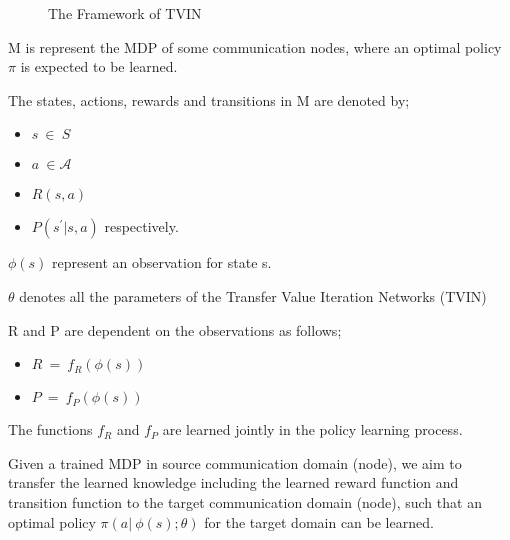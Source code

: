 \documentclass[letterpaper%
, twoside%
, 12pt%
,thesepararticles%
, english%
,creativecommons,hyperref, withAlgo2e%
]{thETS}
\begin{document}
\begin{figure}
\caption{The Framework of TVIN}
\end{figure}

M is represent the MDP of some communication nodes, where an optimal policy $\displaystyle \pi $ is expected to be learned.

The states, actions, rewards and transitions in M are denoted by;
\begin{itemize}
\item $\displaystyle s\ \in \mathcal{\ } S$
\item $\displaystyle a\ \in \mathcal{A}$
\item $\displaystyle R( s,a)$
\item $\displaystyle P\left( s^{'} |s,a\right)$ respectively.
\end{itemize}

$\displaystyle \phi ( s)$ represent an observation for state s.

$\displaystyle \theta $ denotes all the parameters of the Transfer Value Iteration Networks (TVIN)

R and P are dependent on the observations as follows; 
\begin{itemize}
\item $\displaystyle R\ =\ f_{R}( \phi ( s))$
\item $\displaystyle P\ =\ f_{P}( \phi ( s))$
\end{itemize}

The functions $\displaystyle f_{R}$ and $\displaystyle f_{P}$ are learned jointly in the policy learning process.

Given a trained MDP in source communication domain (node), we aim to transfer the learned knowledge including the learned reward function and transition function to the target communication domain (node), such that an optimal policy $\displaystyle \pi ( a|\ \phi ( s) ;\theta )$ for the target domain can be learned. 
\end{document}
